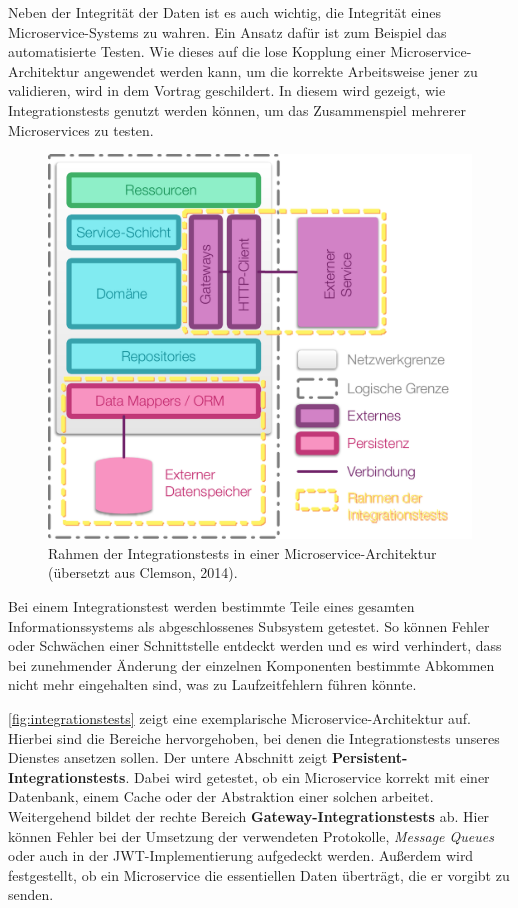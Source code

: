 Neben der Integrität der Daten ist es auch wichtig, die Integrität eines Microservice-Systems zu wahren. Ein Ansatz dafür ist zum Beispiel das automatisierte Testen. Wie dieses auf die lose Kopplung einer Microservice-Architektur angewendet werden kann, um die korrekte Arbeitsweise jener zu validieren, wird in dem Vortrag \cite{Clemson14} geschildert. In diesem wird gezeigt, wie Integrationstests genutzt werden können, um das Zusammenspiel mehrerer Microservices zu testen.

\begin{figure}[h]
	\centering
	\includegraphics[width=.6\linewidth]{img/inte}
	\caption{Rahmen der Integrationstests in einer Microservice-Architektur (übersetzt aus Clemson, 2014).}
	\label{fig:integrationstests}
\end{figure}

Bei einem Integrationstest werden bestimmte Teile eines gesamten Informationssystems als abgeschlossenes Subsystem getestet. So können Fehler oder Schwächen einer Schnittstelle entdeckt werden und es wird verhindert, dass bei zunehmender Änderung der einzelnen Komponenten bestimmte Abkommen nicht mehr eingehalten sind, was zu Laufzeitfehlern führen könnte.

\autoref{fig:integrationstests} zeigt eine exemplarische Microservice-Architektur auf. Hierbei sind die Bereiche hervorgehoben, bei denen die Integrationstests unseres Dienstes ansetzen sollen. Der untere Abschnitt zeigt \textbf{Persistent-Integrationstests}. Dabei wird getestet, ob ein Microservice korrekt mit einer Datenbank, einem Cache oder der Abstraktion einer solchen arbeitet. Weitergehend bildet der rechte Bereich \textbf{Gateway-Integrationstests} ab. Hier können Fehler bei der Umsetzung der verwendeten Protokolle, \textit{Message Queues} oder auch in der JWT-Implementierung aufgedeckt werden. Außerdem wird festgestellt, ob ein Microservice die essentiellen Daten überträgt, die er vorgibt zu senden.

